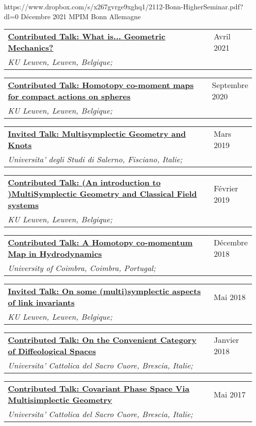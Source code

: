 \documentclass[a4paper]{article}
\newcommand{\longvoice}[8]{
    \begin{tabular}{p{0.83\linewidth} p{0.17\linewidth} }
        \textbf{\href{#3}{#2: #1}} & #4 
        \\ 
        \textit{#5, #6, #7;} & {\small\emph{#8}}
    \end{tabular}
    \vspace{.5em}
    }
\begin{document}
        {https://www.dropbox.com/s/x267gvrge9xghq1/2112-Bonn-HigherSeminar.pdf?dl=0}
        {Décembre 2021}
        {MPIM}
        {Bonn}
        {Allemagne}
        {}
    \longvoice{What is... Geometric Mechanics?}
        {Contributed Talk}
        {https://wis.kuleuven.be/agenda/PhdColloquia/ay20-21/copy4_of_PhD-coll-Molag}
        {Avril 2021}
        {KU Leuven}
        {Leuven}
        {Belgique}
        {}
    \longvoice{Homotopy co-moment maps for compact actions on spheres}
        {Contributed Talk}
        {https://www.researchgate.net/publication/344220375_Homotopy_co-moment_maps_for_compact_actions_on_spheres}
        {Septembre 2020}
        {KU Leuven}
        {Leuven}
        {Belgique}
        {}
    \longvoice{Multisymplectic Geometry and Knots}
        {Invited Talk}
        {https://www.researchgate.net/publication/331939491_Multisymplectic_aspects_of_link_invariants}
        {Mars 2019}
        {Universita' degli Studi di Salerno}
        {Fisciano}
        {Italie}
        {}
    \longvoice{(An introduction to )MultiSymplectic Geometry and Classical Field systems}
        {Contributed Talk}
        {https://www.dropbox.com/s/q68uv6hbbej8d09/1902-Talk-MultisymplecticFields.pdf?dl=0}
        {Février 2019}
        {KU Leuven}
        {Leuven}
        {Belgique}
        {}
    \longvoice{A Homotopy co-momentum Map in Hydrodynamics}
        {Contributed Talk}
        {https://www.researchgate.net/publication/329572409_Homotopy_co-momentum_Map_in_Hydrodynamics}
        {Décembre 2018}
        {University of Coimbra}
        {Coimbra}
        {Portugal}
        {}
    \longvoice{On some (multi)symplectic aspects of link invariants}
        {Invited Talk}
        {https://web.archive.org/web/20180424133109/https://wis.kuleuven.be/agenda/sem-geometry/academic-year-2017-2018/seminar_differential_geometry_Miti}
        {Mai 2018}
        {KU Leuven}
        {Leuven}
        {Belgique}
        {}
    \longvoice{On the Convenient Category of Diffeological Spaces}
        {Contributed Talk}
        {https://www.dropbox.com/s/thm6unntpduynh3/1801-Talk-ConvenientDiffeological.pdf?dl=0}
        {Janvier 2018}
        {Universita' Cattolica del Sacro Cuore}
        {Brescia}
        {Italie}
        {}
    \longvoice{Covariant Phase Space Via Multisimplectic Geometry}
        {Contributed Talk}
        {https://www.researchgate.net/publication/319301194_Notes_on_Covariant_Phase_Space_via_MultiSymplectic_Geometry}
        {Mai 2017}
        {Universita' Cattolica del Sacro Cuore}
        {Brescia}
        {Italie}
        {}
\end{document}
